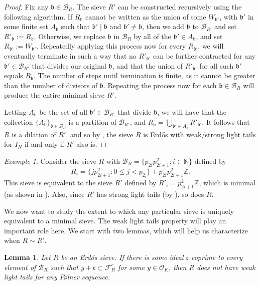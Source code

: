 \documentclass[a4paper,11pt,reqno]{amsart}
\theoremstyle{plain}
\newtheorem{lemma}[theorem]{Lemma}
\theoremstyle{remark}
\newtheorem{example}[theorem]{Example}
\newcommand{\z}{\mathbb{Z}}
\newcommand{\cb}{\mathcal{B}}
\newcommand{\co}{\mathcal{O}}
\newcommand{\fr}{\mathcal{F}_R}
\newcommand{\gb}{\mathfrak{b}}
\newcommand{\gc}{\mathfrak{c}}
\begin{document}
		
		\begin{proof}
			Fix any $\gb \in \cb_R$. The sieve $R'$ can be constructed recursively using the following algorithm. If $R_\gb$ cannot be written as the union of some $W_{\gb'}$, with $\gb'$ in some finite set $A_\gb$ such that $\gb' \mid \gb$ and $\gb' \neq \gb$, then we add $\gb$ to $\cb_{R'}$ and set $R'_\gb := R_\gb$. Otherwise, we replace $\gb$ in $\cb_R$ by all of the $\gb' \in A_\gb$, and set $R_{\gb'} := W_{\gb'}$. Repeatedly applying this process now for every $R_{\gb'}$, we will eventually terminate in such a way that no $R'_{\gb'}$ can be further contracted for any $\gb' \in \cb_{R'}$ that divides our original $\gb$, and that the union of $R'_{\gb'}$ for all such $\gb'$ equals $R_\gb$. The number of steps until termination is finite, as it cannot be greater than the number of divisors of $\gb$. Repeating the process now for each $\gb \in \cb_R$ will produce the entire minimal sieve $R'$. 
			
			Letting $A_\gb$ be the set of all $\gb' \in \cb_{R'}$ that divide $\gb$, we will have that the collection $\{A_\gb\}_{\gb \in \cb_R}$ is a partition of $\cb_{R'}$, and $R_\gb = \bigcup_{\gb' \in A_\gb} R'_{\gb'}. $ It follows that $R$ is a dilation of $R'$, and so by , the sieve $R$ is Erdős with weak/strong light tails for $I_N$ if and only if $R'$ also is.
		\end{proof}
		
		\begin{example}
			Consider the sieve $R$ with $\cb_R = \{p_{2i}p_{2i+1}^2: i \in \mathbb{N}\}$ defined by $$R_i = \{jp_{2i+1}^2: 0\leq j < p_{2_i}\} + p_{2i}p_{2i+1}^2\z.$$ This sieve is equivalent to the sieve $R'$ defined by $R'_i = p_{2i+1}^2\z$, which is minimal (as shown in ). Also, since $R'$ has strong light tails (by  ), so does $R$.
		\end{example}
		
		We now want to study the extent to which any particular sieve is uniquely equivalent to a minimal sieve. The weak light tails property will play an important role here. We start with two lemmas, which will help us characterize when $R \sim R'$. 
		
		
		
		
		\begin{lemma}
			\label{lm: if contains coprime ideal then no weak light tails}
			Let $R$ be an Erdős sieve. If there is some ideal $\gc$ coprime to every element of $\cb_R$ such that $y+\gc \subset \fr^c$ for some $y \in \co_K$, then $R$ does not have weak light tails for any Følner sequence.
		\end{lemma}
		
\end{document}
